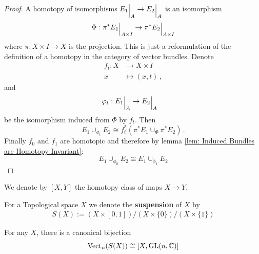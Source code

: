 \begin{proof}
	A homotopy of isomorphisms ${E_1}\einsch{A}\to {E_2}\einsch{A}$ is an isomorphism 
	\begin{equation*}
		\Phi: \pi^*{E_1}\einsch{A \times I} \to \pi^* {E_2}\einsch{A\times I }
	\end{equation*} where $\pi:X\times I\to X$ is the projection. This is just a reformulation of the definition of a homotopy in the category of vector bundles. Denote 
	\begin{align*}
		f_t:X&\to X\times I\\
		x &\mapsto (x,t)\, ,
	\end{align*}  and 
	\begin{align*}
		\phi_t: {E_1}\einsch{A}&\to {E_2}\einsch{A} 
	\end{align*} be the isomorphism induced from $\Phi$ by $f_t$. Then
	\begin{equation*}
		E_1 \cup_{\phi_t} E_2 \cong f_t^*(\pi^*E_1 \cup_{\Phi}\pi^*E_2) \,.
	\end{equation*} Finally $f_0$ and $f_1$ are homotopic and therefore by lemma \ref{lem: Induced Bundles are Homotopy Invariant}:
	\begin{equation*}
		E_1 \cup_{\phi_0} E_2\cong E_1 \cup_{\phi_1} E_2
	\end{equation*}
\end{proof}
\begin{definition}
	We denote by $[X,Y]$ the homotopy class of maps $X\to Y$.
\end{definition}
\begin{definition}
	For a Topological space $X$ we denote the \textbf{suspension} of $X$ by 
	\begin{align*}
		S(X):= (X \times [0,1])\slash (X\times \{0\})\big/ ( X\times \{1\})
	\end{align*}
\end{definition}
\begin{lemma} \label{lem: Vect n cong GLnC}
	For any $X$, there is a canonical bijection
	\begin{equation*}
		\operatorname{\mathrm{Vect}}_n(S(X))\cong [X,\mathrm{GL}(n,\mathbb{C})]
	\end{equation*}
\end{lemma}
